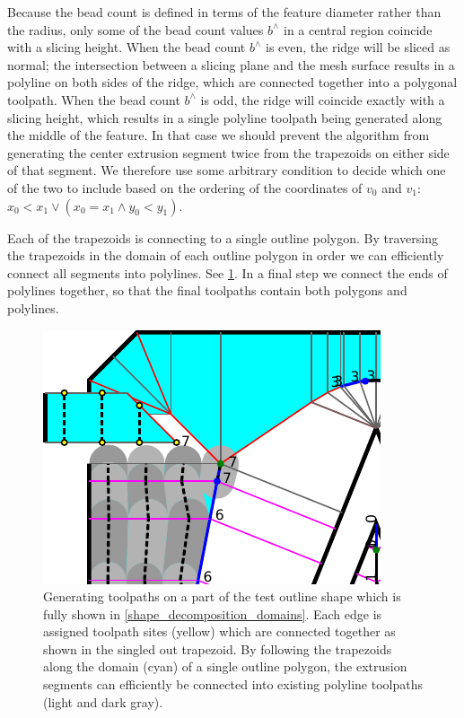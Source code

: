 Because the bead count is defined in terms of the feature diameter rather than the radius, only some of the bead count values $b^\wedge$ in a central region coincide with a slicing height.
When the bead count $b^\wedge$ is even, the ridge will be sliced as normal;
the intersection between a slicing plane and the mesh surface results in a polyline on both sides of the ridge, which are connected together into a polygonal toolpath.
When the bead count $b^\wedge$ is odd, the ridge will coincide exactly with a slicing height, which results in a single polyline toolpath being generated along the middle of the feature.
In that case we should prevent the algorithm from generating the center extrusion segment twice from the trapezoids on either side of that segment.
We therefore use some arbitrary condition to decide which one of the two to include based on the ordering of the coordinates of $v_0$ and $v_1$: $x_0 < x_1 \lor (x_0 = x_1 \land y_0 < y_1)$.



Each of the trapezoids is connecting to a single outline polygon.
By traversing the trapezoids in the domain of each outline polygon in order we can efficiently connect all segments into polylines.
See \cref{segment_generation}.
In a final step we connect the ends of polylines together, so that the final toolpaths contain both polygons and polylines.

\begin{figure}
\centering
\includegraphics[width=.5\columnwidth]{sources/method/segment_generation.pdf}
\caption{
Generating toolpaths on a part of the test outline shape which is fully shown in \cref{shape_decomposition_domains}.
Each edge is assigned toolpath sites (yellow) which are connected together as shown in the singled out trapezoid.
By following the trapezoids along the domain (cyan) of a single outline polygon,
the extrusion segments can efficiently be connected into existing polyline toolpaths (light and dark gray).
}
\label{segment_generation}
\end{figure}


